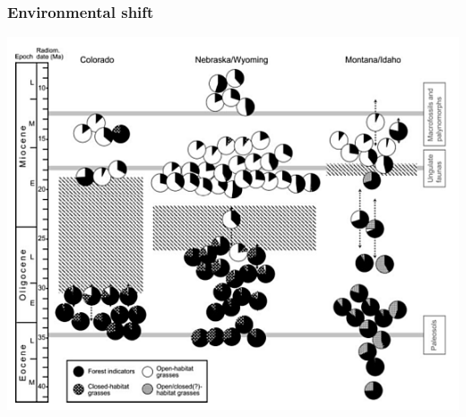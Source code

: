 \documentclass{beamer}
\begin{document}
\begin{frame}
  \frametitle{Environmental shift}
  \begin{center}
    \includegraphics[width=\textwidth,height=0.8\textheight,keepaspectratio=true]{figure/stromberg_na}
  \end{center}

\end{frame}
\end{document}
